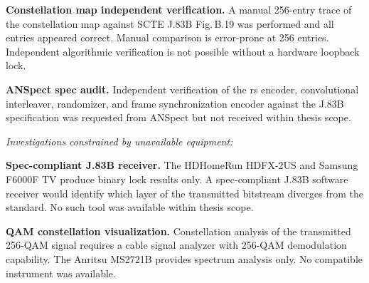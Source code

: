 \begin{tightemize}
  \item \textbf{Constellation map independent verification.}
        A manual 256-entry trace of the constellation map against
        SCTE J.83B Fig.\,B.19 was performed and all entries appeared
        correct.
        Manual comparison is error-prone at 256 entries.
        Independent algorithmic verification is not possible without
        a hardware loopback lock.

  \item \textbf{ANSpect spec audit.}
        Independent verification of the \ac{rs} encoder, convolutional
        interleaver, randomizer, and frame synchronization encoder
        against the J.83B specification was requested from ANSpect
        but not received within thesis scope.

\end{tightemize}

\textit{Investigations constrained by unavailable equipment:}
\begin{tightemize}

  \item \textbf{Spec-compliant J.83B receiver.}
        The HDHomeRun HDFX-2US and Samsung F6000F TV produce binary
        lock results only.
        A spec-compliant J.83B software receiver would identify which
        layer of the transmitted bitstream diverges from the standard.
        No such tool was available within thesis scope.

  \item \textbf{QAM constellation visualization.}
        Constellation analysis of the transmitted 256-QAM signal
        requires a cable signal analyzer with 256-QAM demodulation
        capability.
        The Anritsu MS2721B provides spectrum analysis only.
        No compatible instrument was available.
\end{tightemize}